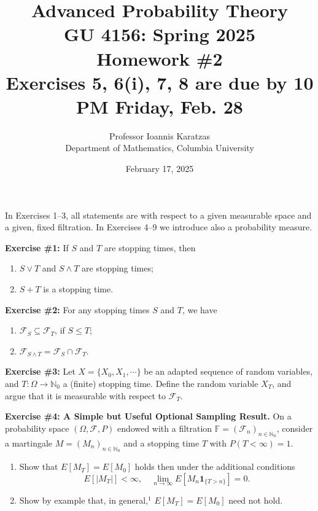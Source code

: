 \documentclass[12pt]{article}
\title{\textbf{Advanced Probability Theory}\\
GU 4156: Spring 2025\\
\large Homework \#2\\
\small Exercises 5, 6(i), 7, 8 are due by 10 PM Friday, Feb. 28}
\author{Professor Ioannis Karatzas\\
Department of Mathematics, Columbia University}
\date{February 17, 2025}
\begin{document}
\maketitle

\noindent In Exercises 1--3, all statements are with respect to a given measurable space and a given, fixed filtration. In Exercises 4--9 we introduce also a probability measure.

\bigskip

\noindent\textbf{Exercise \#1:} If $S$ and $T$ are stopping times, then
\begin{enumerate}
    \item[(i)] $S \vee T$ and $S \wedge T$ are stopping times;
    \item[(ii)] $S + T$ is a stopping time.
\end{enumerate}

\bigskip

\noindent\textbf{Exercise \#2:} For any stopping times $S$ and $T$, we have
\begin{enumerate}
    \item[(i)] $\mathcal{F}_S \subseteq \mathcal{F}_T$, if $S \leq T$;
    \item[(ii)] $\mathcal{F}_{S \wedge T} = \mathcal{F}_S \cap \mathcal{F}_T$.
\end{enumerate}

\bigskip

\noindent\textbf{Exercise \#3:} Let $X = \{X_0, X_1, \cdots\}$ be an adapted sequence of random variables, and $T : \Omega \to \mathbb{N}_0$ a (finite) stopping time. Define the random variable $X_T$, and argue that it is measurable with respect to $\mathcal{F}_T$.

\bigskip

\noindent\textbf{Exercise \#4: A Simple but Useful Optional Sampling Result.} On a probability space $(\Omega, \mathcal{F}, P)$ endowed with a filtration $\mathbb{F} = (\mathcal{F}_n)_{n \in \mathbb{N}_0}$, consider a martingale $M = (M_n)_{n \in \mathbb{N}_0}$ and a stopping time $T$ with $P(T < \infty) = 1$.
\begin{enumerate}
    \item[(a)] Show that $E\left[M_T\right] = E\left[M_0\right]$ holds then under the additional conditions
    \[
        E\left[|M_T|\right] < \infty, \quad \lim_{n \to \infty} E\left[M_n \mathbf{1}_{\{T > n\}}\right] = 0.
    \]
    \item[(b)] Show by example that, in general,$^1$ $E\left[M_T\right] = E\left[M_0\right]$ need not hold.
\end{enumerate}
\end{document}
